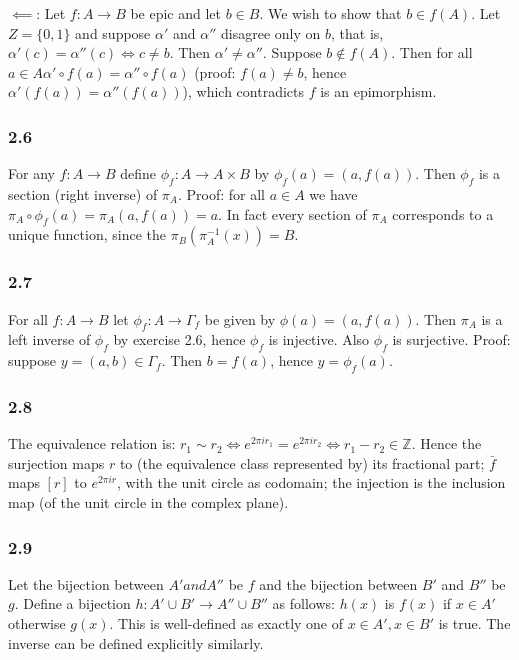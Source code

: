 \documentclass{article}
\def\Z{\mathbb{Z}}
\begin{document}
$\impliedby$: Let $f: A \to B$ be epic and let $b \in B$. We wish to show that $b \in f(A)$. Let $Z = \{0, 1\}$ and suppose $\alpha'$ and $\alpha''$ disagree only on $b$, that is, $\alpha'(c) = \alpha''(c) \iff c \ne b$. Then $\alpha' \ne \alpha''$. Suppose $b \not\in f(A)$. Then for all $a \in A \alpha' \circ f(a) = \alpha'' \circ f(a)$ (proof: $f(a) \ne b$, hence $\alpha'(f(a)) = \alpha''(f(a))$), which contradicts $f$ is an epimorphism.

\subsubsection*{2.6}

For any $f: A \to B$ define $\phi_f: A \to A \times B$ by $\phi_f(a) = (a, f(a))$. Then $\phi_f$ is a section (right inverse) of $\pi_A$. Proof: for all $a \in A$ we have $\pi_A \circ \phi_f (a) = \pi_A (a, f(a)) = a$. In fact every section of $\pi_A$ corresponds to a unique function, since the $\pi_B(\pi_A^{-1}(x)) = B$.

\subsubsection*{2.7}

For all $f: A \to B$ let $\phi_f: A \to \Gamma_f$ be given by $\phi(a) = (a, f(a))$. Then $\pi_A$ is a left inverse of $\phi_f$ by exercise 2.6, hence $\phi_f$ is injective. Also $\phi_f$ is surjective. Proof: suppose $y = (a, b) \in \Gamma_f$. Then $b = f(a)$, hence $y = \phi_f(a)$.

\subsubsection*{2.8}

The equivalence relation is: $r_1 \sim r_2 \iff e^{2\pi ir_1} = e^{2\pi ir_2} \iff r_1 - r_2 \in \Z$. Hence the surjection maps $r$ to (the equivalence class represented by) its fractional part; $\bar f$ maps $[r]$ to $e^{2\pi ir}$, with the unit circle as codomain; the injection is the inclusion map (of the unit circle in the complex plane).

\subsubsection*{2.9}

Let the bijection between $A' and A''$ be $f$ and the bijection between $B'$ and $B''$ be $g$. Define a bijection $h: A' \cup B' \to A'' \cup B''$ as follows: $h(x)$ is $f(x)$ if $x \in A'$ otherwise $g(x)$. This is well-defined as exactly one of $x \in A', x \in B'$ is true. The inverse can be defined explicitly similarly.
\end{document}
